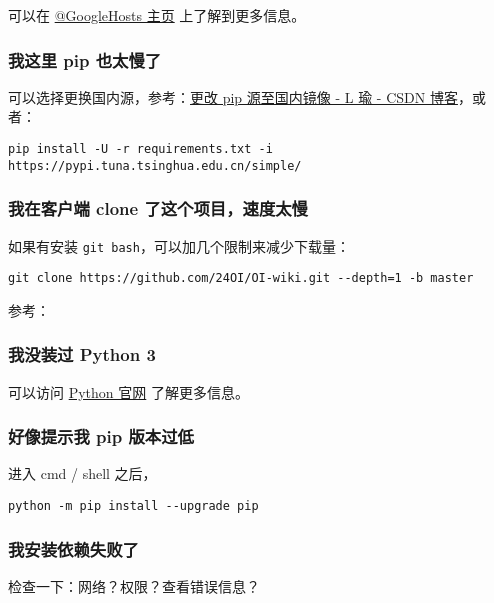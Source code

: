 可以在 \href{https://github.com/googlehosts/hosts}{@GoogleHosts 主页} 上了解到更多信息。

\subsubsection{我这里 pip 也太慢了}

可以选择更换国内源，参考：\href{https://blog.csdn.net/lambert310/article/details/52412059}{更改 pip 源至国内镜像 - L 瑜 - CSDN 博客}，或者：

\begin{verbatim}
pip install -U -r requirements.txt -i https://pypi.tuna.tsinghua.edu.cn/simple/
\end{verbatim}

\subsubsection{我在客户端 clone 了这个项目，速度太慢}

如果有安装 \texttt{git bash}，可以加几个限制来减少下载量：

\begin{verbatim}
git clone https://github.com/24OI/OI-wiki.git --depth=1 -b master
\end{verbatim}

参考：\href{https://blog.csdn.net/FreeApe/article/details/46845555}{}

\subsubsection{我没装过 Python 3}

可以访问 \href{https://www.python.org/downloads/}{Python 官网} 了解更多信息。

\subsubsection{好像提示我 pip 版本过低}

进入 cmd / shell 之后，

\begin{verbatim}
python -m pip install --upgrade pip
\end{verbatim}

\subsubsection{我安装依赖失败了}

检查一下：网络？权限？查看错误信息？

